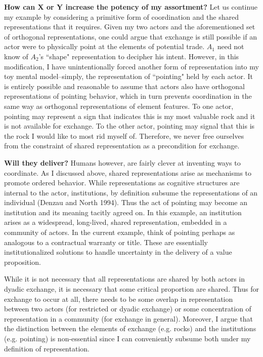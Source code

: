 \textbf{How can X or Y increase the potency of my assortment?}
Let us continue my example by considering a primitive form of coordination and the shared representations that it requires. Given my two actors and the aforementioned set of orthogonal representations, one could argue that exchange is still possible if an actor were to physically point at the elements of potential trade. $A_1$ need not know of $A_2$'s ``shape" representation to decipher his intent. However, in this modification, I have unintentionally forced another form of representation into my toy mental model--simply, the representation of ``pointing" held by each actor. It is entirely possible and reasonable to assume that actors also have orthogonal representations of pointing behavior, which in turn prevents coordination in the same way as orthogonal representations of element features. To one actor, pointing may represent a sign that indicates this is my most valuable rock and it is not available for exchange. To the other actor, pointing may signal that this is the rock I would like to most rid myself of. Therefore, we never free ourselves from the constraint of shared representation as a precondition for exchange. 

\textbf{Will they deliver?}
Humans however, are fairly clever at inventing ways to coordinate. As I discussed above, shared representations arise as mechanisms to promote ordered behavior. While representations as cognitive structures are internal to the actor, institutions, by definition subsume the representations of an individual (Denzau and North 1994). Thus the act of pointing may become an institution and its meaning tacitly agreed on. In this example, an institution arises as a widespread, long-lived, shared representation, embedded in a community of actors. In the current example, think of pointing perhaps as analogous to a contractual warranty or title. These are essentially institutionalized solutions to handle uncertainty in the delivery of a value proposition. 

While it is not necessary that all representations are shared by both actors in dyadic exchange, it is necessary that some critical proportion are shared. Thus for exchange to occur at all, there needs to be some overlap in representation between two actors (for restricted or dyadic exchange) or some concentration of representation in a community (for exchange in general). Moreover, I argue that the distinction between the elements of exchange (e.g. rocks) and the institutions (e.g. pointing) is non-essential since I can conveniently subsume both under my definition of representation. 

